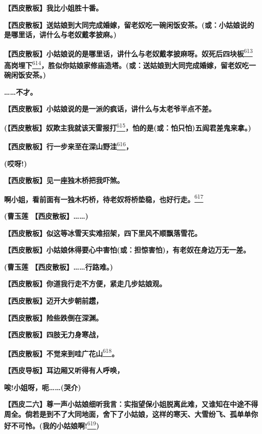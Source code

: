 \textbf{【西皮散板】我比小姐胜十番。}

\textbf{【西皮散板】送姑娘到大同完成婚嫁，留老奴吃一碗闲饭安茶。(或：小姑娘说的是哪里话，讲什么与老奴戴孝披麻。)}

\textbf{【西皮散板】小姑娘说的是哪里话，讲什么与老奴戴孝披麻呀。奴死后四块板}\protect\hyperlink{fn613}{\textsuperscript{613}}\textbf{高岗埋下}\protect\hyperlink{fn614}{\textsuperscript{614}}\textbf{，胜似你姑娘家修庙造塔。(或：送姑娘到大同完成婚嫁，留老奴吃一碗闲饭安茶。)}

\textbf{\ldots{}\ldots{}不才。}

\textbf{【西皮散板】小姑娘说的是一派的疯话，讲什么与太老爷半点不差。}

\textbf{(【西皮散板】奴欺主我就该天雷报打}\protect\hyperlink{fn615}{\textsuperscript{615}}\textbf{，怕的是(或：怕只怕)五阎君差鬼来拿。)}

\textbf{【西皮散板】行一步来至在深山野洼}\protect\hyperlink{fn616}{\textsuperscript{616}}\textbf{，}

\textbf{(哎呀!)}

\textbf{【西皮散板】见一座独木桥把我吓煞。}

\textbf{啊小姐，看前面有一独木朽桥，待老奴将桥垫稳，也好行走。}\protect\hyperlink{fn617}{\textsuperscript{617}}

\textbf{(曹玉莲 【西皮散板】\ldots{}\ldots{})}

\textbf{【西皮散板】似这等冰雪天实难招架，四下里风不顺飘落雪花。}

\textbf{【西皮散板】小姑娘休得要心中害怕(或：担惊害怕)，有老奴在身边万无一差。}

\textbf{(曹玉莲 【西皮散板】\ldots{}\ldots{}行路难。)}

\textbf{【西皮散板】你道我行走不方便，紧走几步姑娘观。}

\textbf{【西皮散板】迈开大步朝前趱，}

\textbf{【西皮散板】险些跌倒在深渊。}

\textbf{【西皮散板】四肢无力身寒战，}

\textbf{【西皮散板】不觉来到哇广花山}\protect\hyperlink{fn618}{\textsuperscript{618}}\textbf{。}

\textbf{【西皮导板】耳边厢又听得有人呼唤，}

\textbf{唉!小姐呀，呃\ldots{}\ldots{}(哭介)}

\textbf{【西皮二六】尊一声小姑娘细听我言：实指望保小姐脱离此难，又谁知在中途不得周全。倘若是到不了大同地面，舍下了小姑娘，这样的寒天、大雪纷飞、孤单单你好不可怜。(我的小姑娘啊!}\protect\hyperlink{fn619}{\textsuperscript{619}}\textbf{)}

